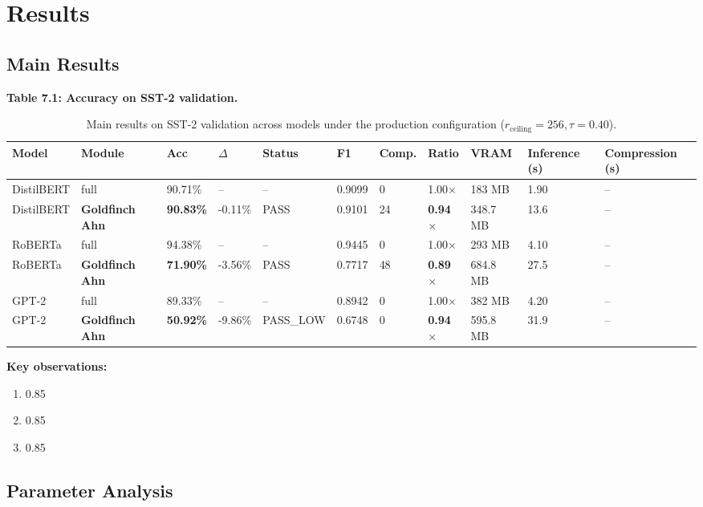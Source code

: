 
\section{Results}

\subsection{Main Results}

\textbf{Table 7.1: Accuracy on SST-2 validation.}

\begin{table}[t]
\centering
\small
\begin{tabular}{lllllllllll}
\toprule
\textbf{Model} & \textbf{Module} & \textbf{Acc} & \textbf{$\Delta$} & \textbf{Status} & \textbf{F1} & \textbf{Comp.} & \textbf{Ratio} & \textbf{VRAM} & \textbf{Inference (s)} & \textbf{Compression (s)} \\
\midrule
DistilBERT & full & 90.71\% & -- & -- & 0.9099 & 0 & 1.00$\times$ & 183 MB & 1.90 & -- \\
DistilBERT & \textbf{Goldfinch Ahn} & \textbf{90.83\%} & -0.11\% & PASS & 0.9101 & 24 & \textbf{0.94$\times$} & 348.7 MB & 13.6 & -- \\
RoBERTa & full & 94.38\% & -- & -- & 0.9445 & 0 & 1.00$\times$ & 293 MB & 4.10 & -- \\
RoBERTa & \textbf{Goldfinch Ahn} & \textbf{71.90\%} & -3.56\% & PASS & 0.7717 & 48 & \textbf{0.89$\times$} & 684.8 MB & 27.5 & -- \\
GPT-2 & full & 89.33\% & -- & -- & 0.8942 & 0 & 1.00$\times$ & 382 MB & 4.20 & -- \\
GPT-2 & \textbf{Goldfinch Ahn} & \textbf{50.92\%} & -9.86\% & PASS\_LOW & 0.6748 & 0 & \textbf{0.94$\times$} & 595.8 MB & 31.9 & -- \\
\bottomrule
\end{tabular}
\caption{Main results on SST-2 validation across models under the production configuration ($r_{\mathrm{ceiling}}=256, \tau=0.40$).}
\label{tab:main_sst2}
\end{table}

\textbf{Key observations:}

\begin{enumerate}
\item 0.85
\item 0.85
\item 0.85

\end{enumerate}
\subsection{Parameter Analysis}

